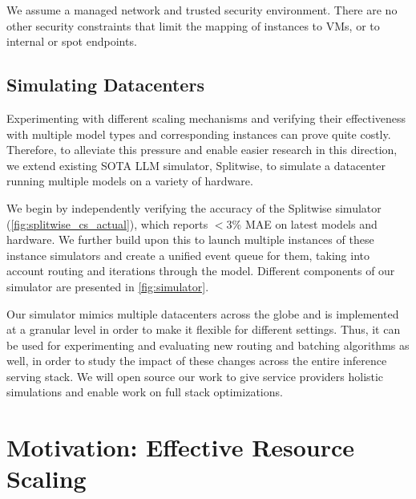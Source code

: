 We assume a managed network and trusted security environment. There are no other security constraints that limit the mapping of instances to VMs, or to internal or spot endpoints.

\subsection{Simulating Datacenters}
Experimenting with different scaling mechanisms and verifying their effectiveness with multiple model types and corresponding instances can prove quite costly. Therefore, to alleviate this pressure and enable easier research in this direction, we extend existing SOTA LLM simulator, Splitwise\cite{splitwise}, to simulate a datacenter running multiple models on a variety of hardware.

We begin by independently verifying the accuracy of the Splitwise simulator (\autoref{fig:splitwise_cs_actual}), which reports  $<$3\% MAE on latest models and hardware. We further build upon this to launch multiple instances of these instance simulators and create a unified event queue for them, taking into account routing and iterations through the model. Different components of our simulator are presented in \autoref{fig:simulator}.

Our simulator mimics multiple datacenters across the globe and is implemented at a granular level in order to make it flexible for different settings. Thus, it can be used for experimenting and evaluating new routing and batching algorithms as well, in order to study the impact of these changes across the entire inference serving stack. We will open source our work to give service providers holistic simulations and enable work on full stack optimizations.





\section{Motivation: Effective Resource Scaling } \label{sec:empstudy} 

